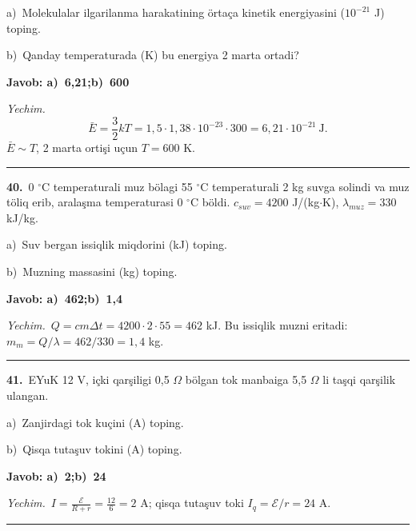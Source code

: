 \documentclass[11pt,a4paper]{article}
\begin{document}
\noindent\hspace*{4mm}a)\ Molekulalar ilgarilanma harakatining örtaça kinetik energiyasini ($10^{-21}$ J) toping.\par
\noindent\hspace*{4mm}b)\ Qanday temperaturada (K) bu energiya 2 marta ortadi?\par
\noindent\colorbox{gray!12}{\parbox{\dimexpr\linewidth-2\fboxsep}{\textbf{Javob: a)\ 6,21;\quad b)\ 600}}}\par\smallskip
\noindent\textit{Yechim.}\ \[\bar E=\frac32kT=1{,}5\cdot1{,}38\cdot10^{-23}\cdot300=6{,}21\cdot10^{-21}\ \text{J}.\]
$\bar E\sim T$, 2 marta ortişi uçun $T=600$ K.\par\par\medskip\hrule\medskip
{}\noindent\textbf{40.}\ 0 $^\circ$C temperaturali muz bölagi 55 $^\circ$C temperaturali 2 kg suvga solindi va muz töliq erib, aralaşma temperaturasi 0 $^\circ$C böldi. $c_{suv}=4200$ J/(kg$\cdot$K), $\lambda_{muz}=330$ kJ/kg.\par
\noindent\hspace*{4mm}a)\ Suv bergan issiqlik miqdorini (kJ) toping.\par
\noindent\hspace*{4mm}b)\ Muzning massasini (kg) toping.\par
\noindent\colorbox{gray!12}{\parbox{\dimexpr\linewidth-2\fboxsep}{\textbf{Javob: a)\ 462;\quad b)\ 1,4}}}\par\smallskip
\noindent\textit{Yechim.}\ $Q=cm\Delta t=4200\cdot2\cdot55=462$ kJ. Bu issiqlik muzni eritadi: $m_m=Q/\lambda=462/330=1{,}4$ kg.\par\par\medskip\hrule\medskip
{}\noindent\textbf{41.}\ EYuK 12 V, içki qarşiligi 0,5 $\Omega$ bölgan tok manbaiga 5,5 $\Omega$ li taşqi qarşilik ulangan.\par
\noindent\hspace*{4mm}a)\ Zanjirdagi tok kuçini (A) toping.\par
\noindent\hspace*{4mm}b)\ Qisqa tutaşuv tokini (A) toping.\par
\noindent\colorbox{gray!12}{\parbox{\dimexpr\linewidth-2\fboxsep}{\textbf{Javob: a)\ 2;\quad b)\ 24}}}\par\smallskip
\noindent\textit{Yechim.}\ $I=\frac{\mathcal E}{R+r}=\frac{12}{6}=2$ A; qisqa tutaşuv toki $I_{q}=\mathcal E/r=24$ A.\par\par\medskip\hrule\medskip
\end{document}
